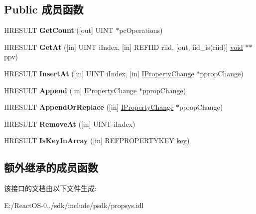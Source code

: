 \subsection*{Public 成员函数}
\begin{DoxyCompactItemize}
\item 
\mbox{\label{interface_i_property_change_array_a299c8547c7b94177cf4d6ce9b3b23b53}} 
H\+R\+E\+S\+U\+LT {\bfseries Get\+Count} (\mbox{[}out\mbox{]} U\+I\+NT $\ast$pc\+Operations)
\item 
\mbox{\label{interface_i_property_change_array_aceb0c2a1a958174bdd753cc10e6d8cb4}} 
H\+R\+E\+S\+U\+LT {\bfseries Get\+At} (\mbox{[}in\mbox{]} U\+I\+NT i\+Index, \mbox{[}in\mbox{]} R\+E\+F\+I\+ID riid, \mbox{[}out, iid\+\_\+is(riid)\mbox{]} \hyperlink{interfacevoid}{void} $\ast$$\ast$ppv)
\item 
\mbox{\label{interface_i_property_change_array_a0d193dc08c41a037f52d000affde6f4a}} 
H\+R\+E\+S\+U\+LT {\bfseries Insert\+At} (\mbox{[}in\mbox{]} U\+I\+NT i\+Index, \mbox{[}in\mbox{]} \hyperlink{interface_i_property_change}{I\+Property\+Change} $\ast$pprop\+Change)
\item 
\mbox{\label{interface_i_property_change_array_a04654dd128b752868ceb545aa9c5c3a6}} 
H\+R\+E\+S\+U\+LT {\bfseries Append} (\mbox{[}in\mbox{]} \hyperlink{interface_i_property_change}{I\+Property\+Change} $\ast$pprop\+Change)
\item 
\mbox{\label{interface_i_property_change_array_aeda37de0c7f0882b7999a744589070f2}} 
H\+R\+E\+S\+U\+LT {\bfseries Append\+Or\+Replace} (\mbox{[}in\mbox{]} \hyperlink{interface_i_property_change}{I\+Property\+Change} $\ast$pprop\+Change)
\item 
\mbox{\label{interface_i_property_change_array_a2a7cb9a5830fff715ce7d326a5f5b873}} 
H\+R\+E\+S\+U\+LT {\bfseries Remove\+At} (\mbox{[}in\mbox{]} U\+I\+NT i\+Index)
\item 
\mbox{\label{interface_i_property_change_array_af9bba12c8fdcd7884812c8af069cf72c}} 
H\+R\+E\+S\+U\+LT {\bfseries Is\+Key\+In\+Array} (\mbox{[}in\mbox{]} R\+E\+F\+P\+R\+O\+P\+E\+R\+T\+Y\+K\+EY \hyperlink{structkey}{key})
\end{DoxyCompactItemize}
\subsection*{额外继承的成员函数}


该接口的文档由以下文件生成\+:\begin{DoxyCompactItemize}
\item 
E\+:/\+React\+O\+S-\/0../sdk/include/psdk/propsys.\+idl\end{DoxyCompactItemize}

